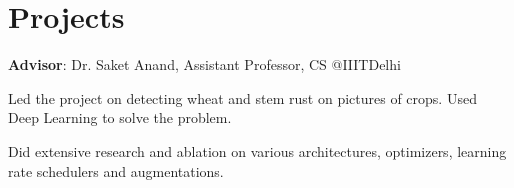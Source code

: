 \documentclass[]{deedy-resume-reversed}
\begin{document}
\begin{minipage}[t]{0.60\textwidth}


\section{Projects}


\textbf{Advisor}: Dr. Saket Anand, Assistant Professor, CS @IIITDelhi
\begin{tightemize}
\item Led the project on detecting wheat and stem rust on pictures of crops. Used Deep Learning to solve the problem.
\item Did extensive research and ablation on various architectures, optimizers, learning rate schedulers and augmentations.
\end{tightemize}


\end{minipage}
\end{document}
